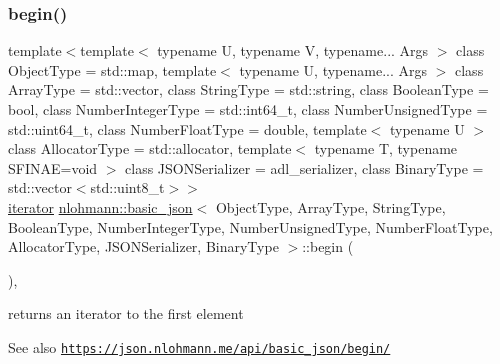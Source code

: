 \subsubsection{\texorpdfstring{begin()}{begin()}\hspace{0.1cm}{\footnotesize\ttfamily [1/2]}}
{\footnotesize\ttfamily template$<$template$<$ typename U, typename V, typename... Args $>$ class Object\+Type = std\+::map, template$<$ typename U, typename... Args $>$ class Array\+Type = std\+::vector, class String\+Type  = std\+::string, class Boolean\+Type  = bool, class Number\+Integer\+Type  = std\+::int64\+\_\+t, class Number\+Unsigned\+Type  = std\+::uint64\+\_\+t, class Number\+Float\+Type  = double, template$<$ typename U $>$ class Allocator\+Type = std\+::allocator, template$<$ typename T, typename S\+F\+I\+N\+A\+E=void $>$ class J\+S\+O\+N\+Serializer = adl\+\_\+serializer, class Binary\+Type  = std\+::vector$<$std\+::uint8\+\_\+t$>$$>$ \\
\hyperlink{classnlohmann_1_1basic__json_aa549b2b382916b3baafb526e5cb410bd}{iterator} \hyperlink{classnlohmann_1_1basic__json}{nlohmann\+::basic\+\_\+json}$<$ Object\+Type, Array\+Type, String\+Type, Boolean\+Type, Number\+Integer\+Type, Number\+Unsigned\+Type, Number\+Float\+Type, Allocator\+Type, J\+S\+O\+N\+Serializer, Binary\+Type $>$\+::begin (\begin{DoxyParamCaption}{ }\end{DoxyParamCaption})\hspace{0.3cm}{\ttfamily [inline]}, {\ttfamily [noexcept]}}



returns an iterator to the first element 

\begin{DoxySeeAlso}{See also}
\href{https://json.nlohmann.me/api/basic_json/begin/}{\tt https\+://json.\+nlohmann.\+me/api/basic\+\_\+json/begin/} 
\end{DoxySeeAlso}
\mbox{\label{classnlohmann_1_1basic__json_a4f147be16fcde9f510c4aac89ab511c9}} 
